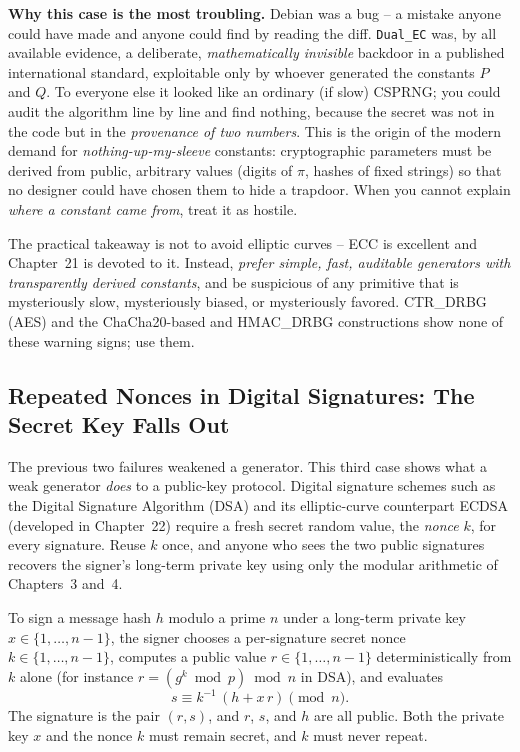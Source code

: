 \begin{whybox}
\textbf{Why this case is the most troubling.} Debian was a bug -- a mistake anyone could have made and anyone could find by reading the diff. \texttt{Dual\_EC} was, by all available evidence, a deliberate, \emph{mathematically invisible} backdoor in a published international standard, exploitable only by whoever generated the constants $P$ and $Q$. To everyone else it looked like an ordinary (if slow) CSPRNG; you could audit the algorithm line by line and find nothing, because the secret was not in the code but in the \emph{provenance of two numbers}. This is the origin of the modern demand for \emph{nothing-up-my-sleeve} constants: cryptographic parameters must be derived from public, arbitrary values (digits of $\pi$, hashes of fixed strings) so that no designer could have chosen them to hide a trapdoor. When you cannot explain \emph{where a constant came from}, treat it as hostile.
\end{whybox}

\begin{focusbox}
The practical takeaway is not to avoid elliptic curves -- ECC is excellent and Chapter~21 is devoted to it. Instead, \emph{prefer simple, fast, auditable generators with transparently derived constants}, and be suspicious of any primitive that is mysteriously slow, mysteriously biased, or mysteriously favored. CTR\_DRBG (AES) and the ChaCha20-based and HMAC\_DRBG constructions show none of these warning signs; use them.
\end{focusbox}

\subsection{Repeated Nonces in Digital Signatures: The Secret Key Falls Out}
\label{ch17:nonce-reuse}

The previous two failures weakened a generator. This third case shows what a weak generator \emph{does} to a public-key protocol. Digital signature schemes such as the Digital Signature Algorithm (DSA) and its elliptic-curve counterpart ECDSA (developed in Chapter~22) require a fresh secret random value, the \emph{nonce} $k$, for every signature. Reuse $k$ once, and anyone who sees the two public signatures recovers the signer's long-term private key using only the modular arithmetic of Chapters~3 and~4.

To sign a message hash $h$ modulo a prime $n$ under a long-term private key $x \in \{1, \dots, n-1\}$, the signer chooses a per-signature secret nonce $k \in \{1, \dots, n-1\}$, computes a public value $r \in \{1, \dots, n-1\}$ deterministically from $k$ alone (for instance $r = (g^k \bmod p) \bmod n$ in DSA), and evaluates
\[
  s \equiv k^{-1}\,(h + x\,r) \pmod n.
\]
The signature is the pair $(r, s)$, and $r$, $s$, and $h$ are all public. Both the private key $x$ and the nonce $k$ must remain secret, and $k$ must never repeat.

